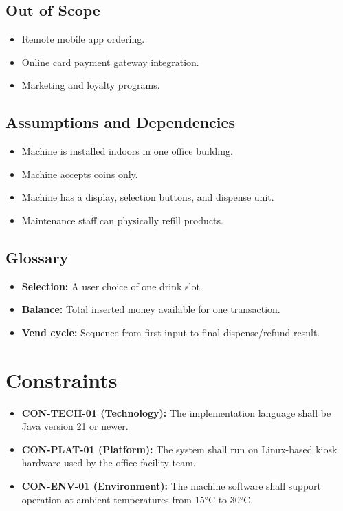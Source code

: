 \documentclass[a4paper,12pt]{article}
\begin{document}
    \subsection{Out of Scope}
    \begin{itemize}[itemsep=0pt,topsep=0pt,parsep=0pt,partopsep=0pt]
        \item Remote mobile app ordering.
        \item Online card payment gateway integration.
        \item Marketing and loyalty programs.
    \end{itemize}

    \subsection{Assumptions and Dependencies}
    \begin{itemize}[itemsep=0pt,topsep=0pt,parsep=0pt,partopsep=0pt]
        \item Machine is installed indoors in one office building.
        \item Machine accepts coins only.
        \item Machine has a display, selection buttons, and dispense unit.
        \item Maintenance staff can physically refill products.
    \end{itemize}

    \subsection{Glossary}
    \begin{itemize}[itemsep=0pt,topsep=0pt,parsep=0pt,partopsep=0pt]
        \item \textbf{Selection:} A user choice of one drink slot.
        \item \textbf{Balance:} Total inserted money available for one transaction.
        \item \textbf{Vend cycle:} Sequence from first input to final dispense/refund result.
    \end{itemize}


    \section{Constraints}
    \begin{itemize}[itemsep=0pt,topsep=0pt,parsep=0pt,partopsep=0pt]
        \item \textbf{CON-TECH-01 (Technology):} The implementation language shall be Java version 21 or newer.
        \item \textbf{CON-PLAT-01 (Platform):} The system shall run on Linux-based kiosk hardware used by the office facility team.
        \item \textbf{CON-ENV-01 (Environment):} The machine software shall support operation at ambient temperatures from 15°C to 30°C.
    \end{itemize}
\end{document}
